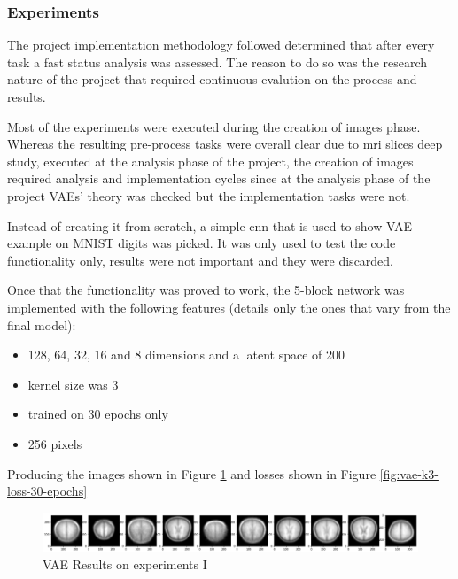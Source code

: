 \FloatBarrier

\subsubsection{Experiments}

The project implementation methodology followed determined that after every task a fast status analysis was assessed. The reason to do so was the research nature of the project that required continuous evalution on the process and results.

Most of the experiments were executed during the creation of images phase. Whereas the resulting pre-process tasks were overall clear due to  \acrshort{mri} slices deep study, executed at the analysis phase of the project, the creation of images required analysis and implementation cycles since at the analysis phase of the project VAEs' theory was checked but the implementation tasks were not.

Instead of creating it from scratch, a simple \acrfull{cnn} that is used to show VAE example on MNIST \cite{mnist} digits was picked. It was only used to test the code functionality only, results were not important and they were discarded. 

Once that the functionality was proved to work, the 5-block network was implemented with the following features (details only the ones that vary from the final model):

\begin{itemize}
    \item 128, 64, 32, 16 and 8 dimensions and a latent space of 200
    \item kernel size was 3
    \item trained on 30 epochs only
    \item 256 pixels
\end{itemize}

Producing the images shown in Figure \ref*{fig:vae-k3-brains-30-epochs} and losses shown in Figure \ref*{fig:vae-k3-loss-30-epochs}

\begin{figure}[ht]
    \centering
    \includegraphics[width = 17cm]{images/vae-k3-brains-30-epochs.png}
    \caption[]{VAE Results on experiments I}
    \label{fig:vae-k3-brains-30-epochs}
\end{figure}

